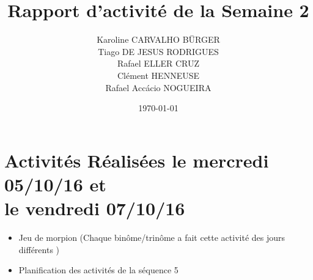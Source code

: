 \documentclass[11pt,a4paper,onecolumn]{articlewithlogo}
\title{Rapport d'activité de la Semaine 2	}
\author{Karoline CARVALHO BÜRGER\\ Tiago DE JESUS RODRIGUES\\  Rafael ELLER CRUZ \\ Clément HENNEUSE\\ Rafael Accácio NOGUEIRA }
\date{\today}
\begin{document}
\maketitle
\section{Activités Réalisées le mercredi 05/10/16 et\\ le vendredi 07/10/16}


\begin{itemize}
	\renewcommand\labelitemi{$\circ$}
	\item Jeu de morpion (Chaque binôme/trinôme a fait cette activité des jours différents )
	\item Planification des activités de la séquence 5 
\end{itemize}







%
\end{document}
